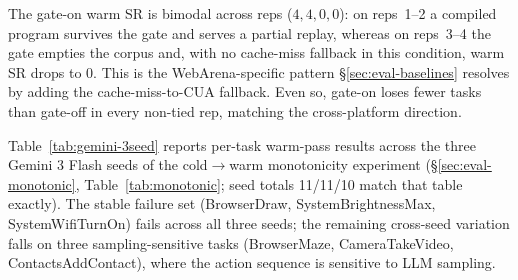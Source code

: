 \documentclass[11pt]{article}
\begin{document}
The gate-on warm SR is bimodal across reps ($4, 4, 0, 0$): on reps~1--2 a compiled program survives the gate and serves a partial replay, whereas on reps~3--4 the gate empties the corpus and, with no cache-miss fallback in this condition, warm SR drops to $0$. This is the WebArena-specific pattern \S\ref{sec:eval-baselines} resolves by adding the cache-miss-to-CUA fallback. Even so, gate-on loses fewer tasks than gate-off in every non-tied rep, matching the cross-platform direction.

Table~\ref{tab:gemini-3seed} reports per-task warm-pass results across the three Gemini 3 Flash seeds of the cold$\to$warm monotonicity experiment (\S\ref{sec:eval-monotonic}, Table~\ref{tab:monotonic}; seed totals 11/11/10 match that table exactly). The stable failure set (BrowserDraw, SystemBrightnessMax, SystemWifiTurnOn) fails across all three seeds; the remaining cross-seed variation falls on three sampling-sensitive tasks (BrowserMaze, CameraTakeVideo, ContactsAddContact), where the action sequence is sensitive to LLM sampling.
\end{document}

